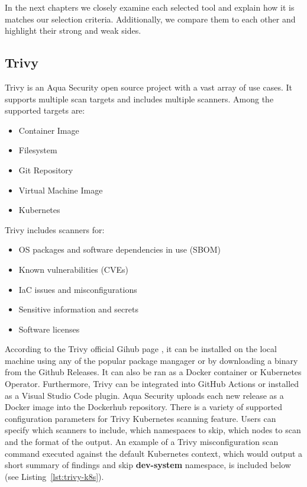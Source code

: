 In the next chapters we closely examine each selected tool and explain how it is matches our selection criteria. Additionally, we compare them to each other and highlight their strong and weak sides.

\subsection{Trivy}
Trivy is an Aqua Security open source project with a vast array of use cases. It supports multiple scan targets and includes multiple scanners. Among the supported targets are:
\begin{itemize}[noitemsep]
    \item Container Image
    \item Filesystem
    \item Git Repository 
    \item Virtual Machine Image
    \item Kubernetes
\end{itemize}
Trivy includes scanners for:
\begin{itemize}[noitemsep]
    \item OS packages and software dependencies in use (SBOM)
    \item Known vulnerabilities (CVEs)
    \item IaC issues and misconfigurations
    \item Sensitive information and secrets
    \item Software licenses
\end{itemize}

According to the Trivy official Gihub page \cite{trivy-github}, it can be installed on the local machine using any of the popular package mangager or by downloading a binary from the Github Releases. It can also be ran as a Docker container or Kubernetes Operator. Furthermore, Trivy can be integrated into GitHub Actions or installed as a Visual Studio Code plugin. Aqua Security uploads each new release as a Docker image into the Dockerhub repository. There is a variety of supported configuration parameters for Trivy Kubernetes scanning feature. Users can specify which scanners to include, which namespaces to skip, which nodes to scan and the format of the output. An example of a Trivy misconfiguration scan command executed against the default Kubernetes context, which would output a short summary of findings and skip \textbf{dev-system} namespace, is included below (see Listing~\ref{lst:trivy-k8s}).

